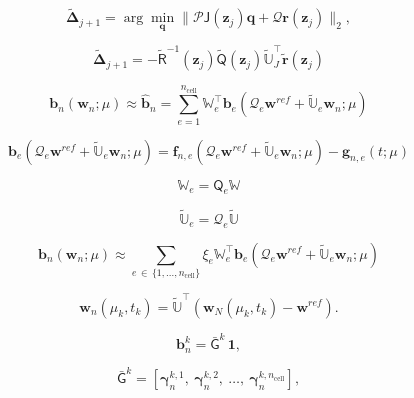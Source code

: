 \documentclass[11pt]{article}
\renewcommand{\vec}[1]{\mathbf{#1}}
\newcommand{\mat}[1]{\mathsf{#1}}
\begin{document}
\begin{equation}
  \tilde{\boldsymbol{\Delta}}_{j+1} = \arg\min_{\vec{q}} \| \mathscr{P} {\mat{J}}(\vec{z}_j) \vec{q} + \mathscr{Q} {\vec{r}}(\vec{z}_j) \|_2,  
\end{equation}

\begin{equation}
\tilde{\boldsymbol{\Delta}}_{j+1} = - \widetilde{\mat{R}}^{-1}(\vec{z}_j) \widetilde{\mat{Q}}(\vec{z}_j) \widetilde{\mathbb{U}}^\top_J \widetilde{\vec{r}}(\vec{z}_j)
\label{eq:normal_J2}
\end{equation}

\begin{equation}
\vec{b}_n(\vec{w}_n; \mu) \approx \widehat{\vec{b}}_n = \sum_{e=1}^{n_{\text{cell}}} \mathbb{W}_e^{\top} \vec{b}_{e} (\mathcal{Q}_e\vec{w}^{ref} + \widetilde{\mathbb{U}}_e \vec{w}_n; \mu)
\label{eq:r_n}
\end{equation}

\begin{equation}
\vec{b}_{e} (\mathcal{Q}_e\vec{w}^{ref} + \widetilde{\mathbb{U}}_e \vec{w}_n; \mu) = \vec{f}_{n,e}(\mathcal{Q}_e\vec{w}^{ref} + \widetilde{\mathbb{U}}_e \vec{w}_n; \mu) - \vec{g}_{n,e}(t; \mu) 
\label{eq:r_e}
\end{equation}

\begin{equation}
\mathbb{W}_e = \mat{Q}_e\mathbb{W}
\end{equation}

\begin{equation}
\widetilde{\mathbb{U}}_e = \mathcal{Q}_e\widetilde{\mathbb{U}}
\end{equation}

\begin{equation}
\vec{b}_n(\vec{w}_n; \mu) \approx \sum_{e\,\in\,\{1,...,n_{\text{cell}}\}} \xi_e \mathbb{W}_e^{\top} \vec{b}_e (\mathcal{Q}_e\vec{w}^{ref} + \widetilde{\mathbb{U}}_e\vec{w}_n; \mu)
\label{eq:r_n_approx}
\end{equation}

\begin{equation}
\vec{w}_n(\mu_k, t_k) = \widetilde{\mathbb{U}}^{\top} \left(\vec{w}_N(\mu_k, t_k)-\vec{w}^{ref}\right).    
\end{equation}

\begin{equation}
\vec{b}_n^{k} = \bar{\mat{G}}^{k}\, \vec{1},
\label{eq:bn_G1}
\end{equation}

\begin{equation}
\bar{\mat{G}}^k = \left[ \boldsymbol{\gamma}_n^{k,1},\ \boldsymbol{\gamma}_n^{k,2},\ \dots,\ \boldsymbol{\gamma}_n^{k,n_{\text{cell}}} \right],
\end{equation}
\end{document}
